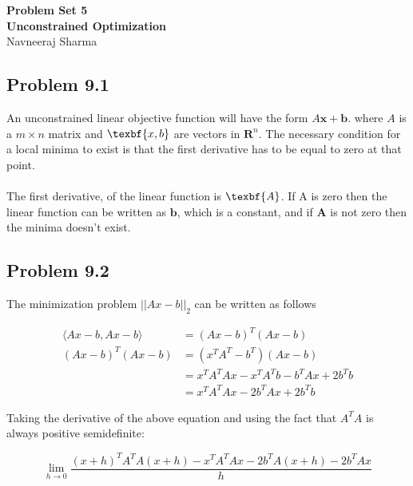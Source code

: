 \documentclass[letterpaper,12pt]{article}
\theoremstyle{definition}
\begin{document}
\begin{flushleft}
\textbf{\large{Problem Set 5}} \\
\vspace{2mm}
\textbf{\large{Unconstrained Optimization}} \\
\vspace{2mm}
Navneeraj Sharma\\
\end{flushleft}

\vspace{2mm}

\subsection*{Problem 9.1}

An unconstrained linear objective function will have the form $A\textbf{x} + \textbf{b}$. where $A$ is a $m\times n$ matrix and $\texbf{x,b}$ are vectors in $\mathbf{R}^n$. The necessary condition for a local minima to exist is that the first derivative has to be equal to zero at that point.
\\\\
The first derivative, of the linear function is $\texbf{A}$. If A is zero then the linear function can be written as $\textbf{b}$, which is a constant, and if $\textbf{A}$ is not zero then the minima doesn't exist. 

\subsection*{Problem 9.2}

The minimization problem $||Ax-b||_2$ can be written as follows

\begin{align*}
\langle Ax-b, Ax-b\rangle &= (Ax-b)^T(Ax-b)\\
(Ax-b)^T(Ax-b) &= (x^TA^T - b^T)(Ax-b) \\ 
&= x^TA^TAx - x^TA^Tb -b^TAx +2b^Tb \\
&= x^TA^TAx -2b^TAx +2b^Tb
\end{align*}
\begin{flushleft}
Taking the derivative of the above equation and using the fact that $A^TA$ is always positive semidefinite:
\end{flushleft}

\begin{equation*}
\lim_{h \to 0}
\frac{(x+h)^TA^TA(x+h) -x^TA^TAx -2b^TA(x+h) -2b^TAx  }{h}
\end{equation*}
\end{document}
